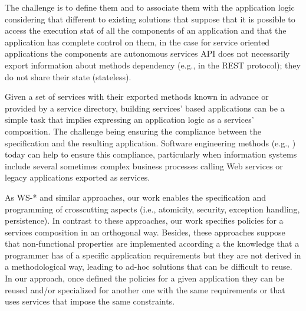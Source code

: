 The challenge is to define them and to associate them with the application logic considering that different to existing solutions that suppose that it is possible to access the execution stat of all the components  of an application and that the application has complete control on them, in the case for service oriented applications  the components are autonomous services
API does not necessarily export information about methods dependency (e.g., in the REST protocol);
they do not share their state (stateless).

Given a set of services with their exported methods known in advance or provided by a  service directory, building services' based applications can be  a simple task that implies expressing an application logic as a services' composition. The challenge being  ensuring the compliance between the specification and the resulting application. Software engineering methods (e.g., \cite{1,2,decastro1,PapazoglouH06}) today can help to ensure this compliance, particularly when information systems include several sometimes complex business processes calling Web services or legacy applications exported as services.

As WS-* and similar approaches, our work enables the specification and programming of crosscutting aspects (i.e., atomicity, security, exception handling, persistence).
In contrast to these approaches, our work specifies policies for a services composition in an orthogonal way. Besides, these approaches suppose that non-functional properties are implemented according a the knowledge that a programmer has of a specific application requirements but they are not derived in a methodological way, leading to ad-hoc solutions that can be difficult to reuse. In our approach, once defined the policies for a given application they can be reused and/or specialized for another one with the same requirements or that uses services that impose the same constraints.